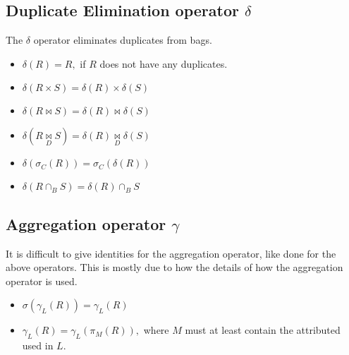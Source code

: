 \subsection{Duplicate Elimination operator $\delta$}
The $\delta$ operator eliminates duplicates from bags. 
\begin{itemize}
    \item $\delta(R)= R,$ if $R$ does not have any duplicates.
    \item $\delta(R \times S) = \delta(R) \times \delta(S)$
    \item $\delta(R \bowtie S) = \delta(R) \bowtie \delta(S)$
    \item $\delta(R \underset{D}{\bowtie} S) = \delta(R) \underset{D}{\bowtie} \delta(S)$
    \item $\delta(\sigma_{C}(R)) = \sigma_{C}(\delta(R))$
    \item $\delta(R \cap_{B} S) = \delta(R) \cap_{B} S$
\end{itemize}

\subsection{Aggregation operator $\gamma$}
It is difficult to give identities for the aggregation operator, like done for the above operators. This is mostly due to how the details of how the aggregation operator is used.
\begin{itemize}
    \item $\sigma(\gamma_{L}(R)) = \gamma_{L}(R)$
    \item $\gamma_{L}(R) = \gamma_{L}(\pi_{M}(R)),$ where $M$ must at least contain the attributed used in $L$.
\end{itemize}
